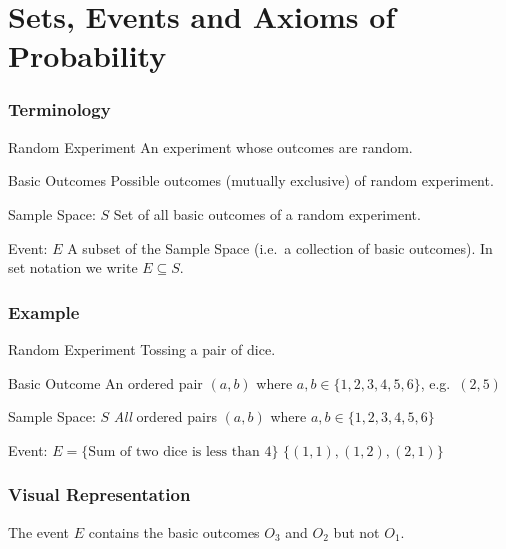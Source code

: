 \section{Sets, Events and Axioms of Probability}
\begin{frame}
\frametitle{Terminology}
\begin{block}{Random Experiment}
An experiment whose outcomes are random.
\end{block}
\begin{block}{Basic Outcomes}
Possible outcomes (mutually exclusive) of random experiment.
\end{block}
\begin{block}{Sample Space: $S$}
Set of all basic outcomes of a random experiment.
\end{block}

\begin{block}{Event: $E$}
A subset of the Sample Space (i.e.\ a collection of basic outcomes). In set notation we write $E \subseteq S$.
\end{block}

\end{frame}
\begin{frame}
\frametitle{Example}
\begin{block}{Random Experiment}
Tossing a pair of dice.
\end{block}
\begin{block}{Basic Outcome}
An ordered pair $(a, b)$ where $a,b \in \{1, 2, 3, 4, 5, 6\}$, e.g.\ $(2,5)$
\end{block}
\begin{block}{Sample Space: $S$}
\emph{All} ordered pairs $(a, b)$ where $a,b \in \{1, 2, 3, 4, 5, 6\}$
\end{block}

\begin{block}{Event: $E = \{\mbox{Sum of two dice is less than 4}\}$}
$\{(1,1), (1,2), (2,1)\}$
\end{block}

\end{frame}
\begin{frame}
\frametitle{Visual Representation}
\begin{figure}
\centering
{}
\end{figure}

\alert{The event $E$ contains the basic outcomes $O_3$ and $O_2$ but not $O_1$.}
\end{frame}

